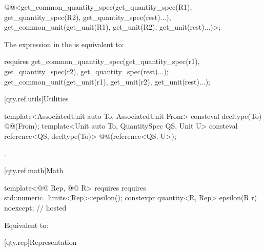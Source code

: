 \begin{itemdescr}
\pnum
\returns
\begin{codeblock}
@@<get_common_quantity_spec(get_quantity_spec(R1{}), get_quantity_spec(R2{}),
                                     get_quantity_spec(rest)...),
            get_common_unit(get_unit(R1{}), get_unit(R2{}), get_unit(rest)...)>{};
\end{codeblock}

\pnum
\remarks
The expression in the  is equivalent to:
\begin{codeblock}
requires {
  get_common_quantity_spec(get_quantity_spec(r1), get_quantity_spec(r2),
                           get_quantity_spec(rest)...);
  get_common_unit(get_unit(r1), get_unit(r2), get_unit(rest)...);
}
\end{codeblock}
\end{itemdescr}

[qty.ref.utils]{Utilities}

\begin{itemdecl}
template<AssociatedUnit auto To, AssociatedUnit From>
consteval decltype(To) @@(From);
template<Unit auto To, QuantitySpec QS, Unit U>
consteval reference<QS, decltype(To)> @@(reference<QS, U>);
\end{itemdecl}

\begin{itemdescr}
\pnum
\returns
\tcode{\{\}}.
\end{itemdescr}

[qty.ref.math]{Math}

\begin{itemdecl}
template<@@ Rep, @@ R>
  requires requires { std::numeric_limits<Rep>::epsilon(); }
constexpr quantity<R{}, Rep> epsilon(R r) noexcept;                                     // hosted
\end{itemdecl}

\begin{itemdescr}
\pnum
\effects
Equivalent to:
\end{itemdescr}

[qty.rep]{Representation}

